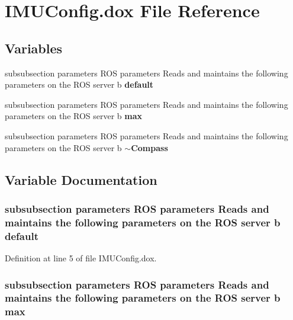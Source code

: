 \section{\-I\-M\-U\-Config.\-dox \-File \-Reference}
\label{IMUConfig_8dox}
\subsection*{\-Variables}
\begin{DoxyCompactItemize}
\item 
subsubsection parameters \-R\-O\-S \*
parameters \-Reads and maintains \*
the following parameters on \*
the \-R\-O\-S server b {\bf default}
\item 
subsubsection parameters \-R\-O\-S \*
parameters \-Reads and maintains \*
the following parameters on \*
the \-R\-O\-S server b {\bf max}
\item 
subsubsection parameters \-R\-O\-S \*
parameters \-Reads and maintains \*
the following parameters on \*
the \-R\-O\-S server b {\bf $\sim$\-Compass}
\end{DoxyCompactItemize}


\subsection{\-Variable \-Documentation}
\subsubsection[{default}]{\setlength{\rightskip}{0pt plus 5cm}subsubsection parameters \-R\-O\-S parameters \-Reads and maintains the following parameters on the \-R\-O\-S server b {\bf default}}\label{IMUConfig_8dox_a94d02332ecf13e7845f06fe8c343e101}


\-Definition at line 5 of file \-I\-M\-U\-Config.\-dox.

\subsubsection[{max}]{\setlength{\rightskip}{0pt plus 5cm}subsubsection parameters \-R\-O\-S parameters \-Reads and maintains the following parameters on the \-R\-O\-S server b {\bf max}}\label{IMUConfig_8dox_a55c9de72d9f3630abdf51bfe39c191dd}


